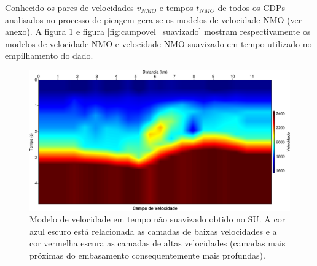 
 Conhecido os pares de velocidades $v_{NMO}$ e tempos $t_{NMO}$ de todos os CDPs analisados no processo de picagem gera-se os modelos de velocidade NMO (ver anexo). A figura \ref{fig:campovel2} e figura \ref{fig:campovel_suavizado} mostram respectivamente os modelos de velocidade NMO e velocidade NMO suavizado em tempo utilizado no empilhamento do dado. 

\begin{landscape}
\begin{figure}[H]
\centering
\includegraphics[totalheight=14cm]{figuras/cap2/campovel2.pdf}
\caption{Modelo de velocidade em tempo não suavizado obtido no SU. A cor azul escuro está relacionada as camadas de baixas velocidades e a cor vermelha escura as camadas de altas velocidades (camadas mais próximas do embasamento consequentemente mais profundas).}
\label{fig:campovel2}
\end{figure}
\end{landscape}

